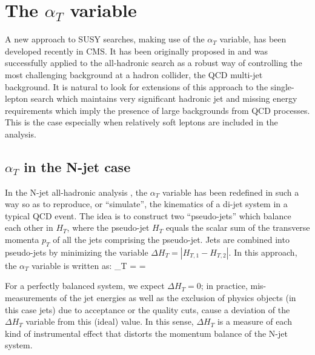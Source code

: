 \section{The $\alpha_{T}$ variable}

A new approach to SUSY searches, making use of the $\alpha_{T}$ variable, has been developed recently in CMS. It has been originally proposed in \cite{lisa} and was successfully applied to the all-hadronic search as a robust way of controlling the most challenging background at a hadron collider, the QCD multi-jet background. It is natural to look for extensions of this approach to the single-lepton search which maintains very significant hadronic jet and missing energy requirements which imply the presence of large backgrounds from QCD processes. This is the case especially when relatively soft leptons are included in the analysis.


\subsection{$\alpha_{T}$ in the N-jet case}
In the N-jet all-hadronic analysis \cite{njet}, the $\alpha_{T}$ variable has been redefined in such a way so as to reproduce, or ``simulate'', the kinematics of a di-jet system in a typical QCD event. The idea is to construct two ``pseudo-jets'' which balance each other in $H_{T}$, where the pseudo-jet $H_{T}$ equals the scalar sum of the transverse momenta $p_{T}$ of all the jets comprising the pseudo-jet. Jets are combined into pseudo-jets by minimizing the variable $\Delta H_{T} = | H_{T,1} - H_{T,2} |$. In this approach, the $\alpha_{T}$ variable is written as:
\bea
\alpha_{T} =   =   
\eea

For a perfectly balanced system, we expect $\Delta H_{T} = 0$; in practice, mis-measurements of the jet energies as well as the exclusion of physics objects (in this case jets) due to acceptance or the quality cuts, cause a deviation of the $\Delta H_{T}$ variable from this (ideal) value. In this sense, $\Delta H_T$ is a measure of each kind of instrumental effect that distorts the momentum balance of the N-jet system.

